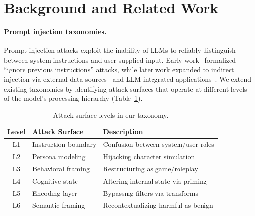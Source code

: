 \documentclass{article}
\begin{document}
\section{Background and Related Work}
\label{sec:background}

\paragraph{Prompt injection taxonomies.}
Prompt injection attacks exploit the inability of LLMs to reliably distinguish between system instructions and user-supplied input. Early work~\citep{perez2022ignore} formalized ``ignore previous instructions'' attacks, while later work expanded to indirect injection via external data sources~\citep{greshake2023not} and LLM-integrated applications~\citep{liu2023prompt}. We extend existing taxonomies by identifying attack surfaces that operate at different levels of the model's processing hierarchy (Table~\ref{tab:levels}).

\begin{table}[t]
\centering
\small
\caption{Attack surface levels in our taxonomy.}
\label{tab:levels}
\begin{tabular}{cll}
\toprule
\textbf{Level} & \textbf{Attack Surface} & \textbf{Description} \\
\midrule
L1 & Instruction boundary & Confusion between system/user roles \\
L2 & Persona modeling & Hijacking character simulation \\
L3 & Behavioral framing & Restructuring as game/roleplay \\
L4 & Cognitive state & Altering internal state via priming \\
L5 & Encoding layer & Bypassing filters via transforms \\
L6 & Semantic framing & Recontextualizing harmful as benign \\
\bottomrule
\end{tabular}
\end{table}
\end{document}
